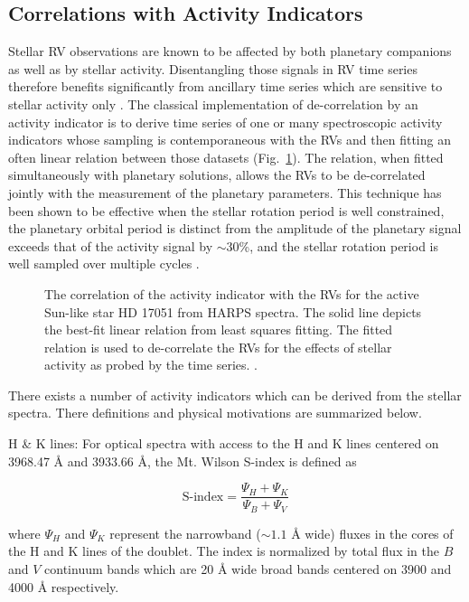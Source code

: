 \subsection{Correlations with Activity Indicators}
Stellar RV observations are known to be affected by both planetary companions as
well as by stellar activity. Disentangling those signals in RV time series
therefore benefits significantly from ancillary time series which are sensitive
to stellar activity only \citep{boisse09}.
The classical implementation of de-correlation by
an activity indicator is to derive time series of one or many spectroscopic
activity indicators whose sampling is contemporaneous with the RVs and then
fitting an often linear relation between those datasets (Fig.~\ref{fig:corr}).
The relation, when fitted simultaneously with planetary solutions, allows the RVs
to be de-correlated jointly with the measurement of the planetary parameters.
This technique has been shown to be effective when the stellar rotation period
\prot{} is well constrained, the planetary orbital period is distinct from
\prot{,} the amplitude of the planetary signal exceeds that of the activity signal
by $\sim 30$\%, and the stellar rotation period is well sampled over multiple
cycles \citep{boisse11}. \\

\begin{figure}
  \centering
  \caption{The correlation of the \vspan{} activity indicator with the RVs for the
    active Sun-like star HD 17051 from HARPS spectra. The solid line depicts the
    best-fit linear relation from least squares fitting. The fitted relation is
    used to de-correlate the RVs for the effects of stellar activity as probed by
    the \vspan{} time series. \citep[Image credit:][]{boisse11}.}
  \label{fig:corr}
\end{figure}

There exists a number of activity indicators which can be derived from the stellar
spectra. There definitions and physical motivations are summarized below.

\caii{} H \& K lines: 
For optical spectra with access to the \caii{} H and K lines
centered on 3968.47 \AA{} and 3933.66 \AA{,} the Mt. Wilson S-index is defined as

\begin{equation}
  \text{S-index} = \frac{\Psi_H + \Psi_K}{\Psi_B + \Psi_V}
\end{equation}

\noindent where $\Psi_H$ and $\Psi_K$ represent the narrowband
($\sim 1.1$ \AA{} wide) fluxes in the cores of the H and K lines of the \caii{}
doublet. The index is normalized by total flux in the $B$ and $V$ continuum bands
which are 20 \AA{} wide broad bands centered on 3900 and 4000 \AA{} respectively.


